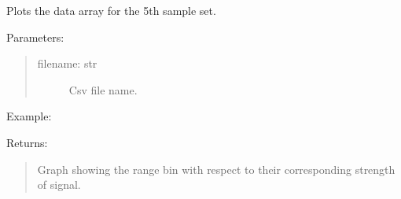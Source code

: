 \documentclass[letterpaper,10pt,english]{sphinxmanual}
\begin{document}
\begin{fulllineitems}
\label{\detokenize{X4 radar:X4_threshold.plot_data}}
Plots the data array for the 5th sample set.

Parameters:
\begin{quote}
\begin{description}
\item[{filename: str}] \leavevmode
Csv file name.

\end{description}
\end{quote}

Example:

\begin{sphinxVerbatim}[commandchars=\\\{\}]
\end{sphinxVerbatim}

Returns:
\begin{quote}

Graph showing the range bin with respect to their corresponding strength of signal.
\end{quote}

\end{fulllineitems}

\end{document}
